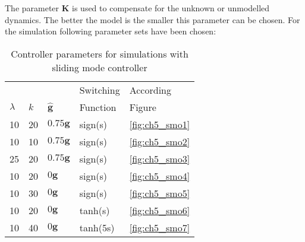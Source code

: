 The parameter $\mathbf{K}$ is used to compensate for the unknown or unmodelled dynamics. The better the model is the smaller this parameter can be chosen.
For the simulation following parameter sets have been chosen: 
\begin{table}[h]
	\begin{center}
		\label{tab:smo}
		\begin{tabular}{lllll}
			&     &							 &Switching& According          \\
			$\lambda$ & $k$ &$\hat{\mathbf{g}}$&Function& Figure             \\
			\midrule
			10    & 20 &$0.75\mathbf{g}  $& sign(s)& \ref{fig:ch5_smo1} \\
			10    & 10 &$0.75\mathbf{g}  $& sign(s)& \ref{fig:ch5_smo2} \\
			25    & 20 &$0.75\mathbf{g}  $& sign(s)& \ref{fig:ch5_smo3} \\
			10    & 20 &$0\mathbf{g}  $& sign(s)& \ref{fig:ch5_smo4} \\
			10    & 30 &$0\mathbf{g}  $& sign(s)& \ref{fig:ch5_smo5} \\
			10    & 20 &$0\mathbf{g}  $& tanh(s)& \ref{fig:ch5_smo6} \\
			10    & 40 &$0\mathbf{g}  $& tanh(5s)& \ref{fig:ch5_smo7} \\
			\bottomrule
		\end{tabular}
		\caption{Controller parameters for simulations with sliding mode controller}
	\end{center}
\end{table}